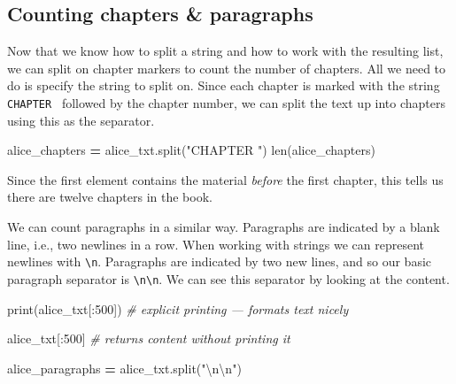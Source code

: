 \documentclass[]{book}
\newenvironment{Shaded}{\begin{snugshade}}{\end{snugshade}}
\newcommand{\BuiltInTok}[1]{#1}
\newcommand{\CharTok}[1]{\textcolor[rgb]{0.31,0.60,0.02}{#1}}
\newcommand{\CommentTok}[1]{\textcolor[rgb]{0.56,0.35,0.01}{\textit{#1}}}
\newcommand{\DecValTok}[1]{\textcolor[rgb]{0.00,0.00,0.81}{#1}}
\newcommand{\NormalTok}[1]{#1}
\newcommand{\OperatorTok}[1]{\textcolor[rgb]{0.81,0.36,0.00}{\textbf{#1}}}
\newcommand{\StringTok}[1]{\textcolor[rgb]{0.31,0.60,0.02}{#1}}
\begin{document}
\hypertarget{counting-chapters-paragraphs}{%
\subsection{Counting chapters \& paragraphs}\label{counting-chapters-paragraphs}}

Now that we know how to split a string and how to work with the resulting list, we can split on chapter markers to count the number of chapters. All we need to do is specify the string to split on. Since each chapter is marked with the string \texttt{\textquotesingle{}CHAPTER\ \textquotesingle{}} followed by the chapter number, we can split the text up into chapters using this as the separator.

\begin{Shaded}
\begin{Highlighting}[]
\NormalTok{alice_chapters }\OperatorTok{=}\NormalTok{ alice_txt.split(}\StringTok{"CHAPTER "}\NormalTok{)}
\BuiltInTok{len}\NormalTok{(alice_chapters)}
\end{Highlighting}
\end{Shaded}

Since the first element contains the material \emph{before} the first chapter, this tells us there are twelve chapters in the book.

We can count paragraphs in a similar way. Paragraphs are indicated by a blank line, i.e., two newlines in a row. When working with strings we can represent newlines with \texttt{\textbackslash{}n}. Paragraphs are indicated by two new lines, and so our basic paragraph separator is \texttt{\textbackslash{}n\textbackslash{}n}. We can see this separator by looking at the content.

\begin{Shaded}
\begin{Highlighting}[]
\BuiltInTok{print}\NormalTok{(alice_txt[:}\DecValTok{500}\NormalTok{]) }\CommentTok{# explicit printing --- formats text nicely}

\NormalTok{alice_txt[:}\DecValTok{500}\NormalTok{] }\CommentTok{# returns content without printing it}
\end{Highlighting}
\end{Shaded}

\begin{Shaded}
\begin{Highlighting}[]
\NormalTok{alice_paragraphs }\OperatorTok{=}\NormalTok{ alice_txt.split(}\StringTok{"}\CharTok{\textbackslash{}n\textbackslash{}n}\StringTok{"}\NormalTok{)}
\end{Highlighting}
\end{Shaded}
\end{document}

